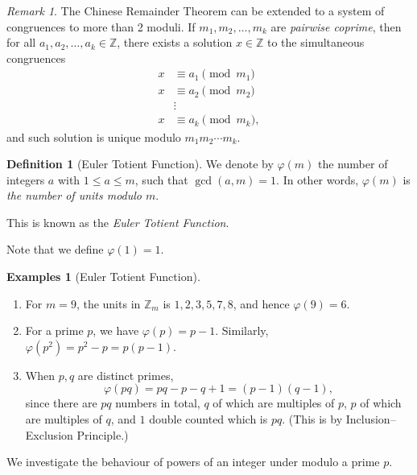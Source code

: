 \documentclass{article}
\theoremstyle{definition}
\newtheorem{definition}[theorem]{Definition}
\newtheorem{examples}[theorem]{Examples}
\theoremstyle{remark}
\newtheorem{remark}[theorem]{Remark}
\newcommand{\pqty}[1]{\left(#1\right)}
\newcommand{\totient}{\varphi}
\newcommand{\ZZ}{\mathbb{Z}}
\begin{document}
\begin{remark}
    The Chinese Remainder Theorem can be extended to a system of congruences to more than 2 moduli. If \(m_1, m_2, \ldots, m_k\) are \emph{pairwise coprime}, then for all \(a_1, a_2, \ldots, a_k \in \ZZ\), there exists a solution \(x \in \ZZ\) to the simultaneous congruences
    \begin{align*}
        x &\equiv a_1 \pmod{m_1} \\
        x &\equiv a_2 \pmod{m_2} \\
          &\vdots \\
        x &\equiv a_k \pmod{m_k},
    \end{align*}
    and such solution is unique modulo \(m_1 m_2 \cdots m_k\).
\end{remark}

\begin{definition}[Euler Totient Function]
    We denote by \(\totient\pqty{m}\) the number of integers \(a\) with \(1 \leq a \leq m\), such that \(\gcd\pqty{a, m} = 1\). In other words, \(\totient\pqty{m}\) is \emph{the number of units modulo \(m\)}.
    
    This is known as the \emph{Euler Totient Function}.

    Note that we define \(\totient\pqty{1} = 1\).
\end{definition}


\begin{examples}[Euler Totient Function]
    \begin{enumerate}
        \item For \(m = 9\), the units in \(\ZZ_m\) is \(1, 2, 3, 5, 7, 8\), and hence \(\totient\pqty{9} = 6\).
        \item For a prime \(p\), we have \(\totient\pqty{p} = p - 1\). Similarly, \(\totient\pqty{p^2} = p^2 - p = p \pqty{p - 1}\).
        \item When \(p, q\) are distinct primes,
        \[
            \totient\pqty{pq} = pq - p - q + 1 = \pqty{p - 1} \pqty{q - 1},
        \]
        since there are \(pq\) numbers in total, \(q\) of which are multiples of \(p\), \(p\) of which are multiples of \(q\), and \(1\) double counted which is \(pq\). (This is by Inclusion--Exclusion Principle.)
    \end{enumerate}
\end{examples}

We investigate the behaviour of powers of an integer under modulo a prime \(p\).
\end{document}
